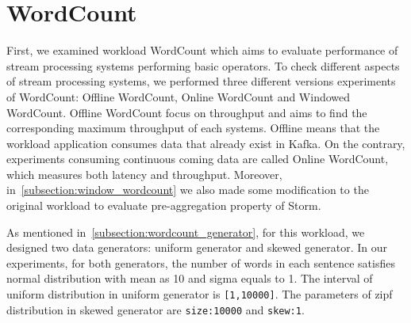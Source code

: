 \section{WordCount}
First, we examined workload WordCount which aims to evaluate performance of stream processing systems performing basic operators. To check different aspects of stream processing systems, we performed three different versions experiments of WordCount: Offline WordCount, Online WordCount and Windowed WordCount. Offline WordCount focus on throughput and aims to find the corresponding maximum throughput of each systems. Offline means that the workload application consumes data that already exist in Kafka. On the contrary, experiments consuming continuous coming data are called Online WordCount, which measures both latency and throughput. Moreover, in~\cref{subsection:window_wordcount} we also made some modification to the original workload to evaluate pre-aggregation property of Storm. 


As mentioned in~\cref{subsection:wordcount_generator}, for this workload, we designed two data generators: uniform generator and skewed generator. In our experiments, for both generators, the number of words in each sentence satisfies normal distribution with mean as 10 and sigma equals to 1. The interval of uniform distribution in uniform generator is \texttt{[1,10000]}.  The parameters of zipf distribution in skewed generator are \texttt{size:10000} and \texttt{skew:1}.


